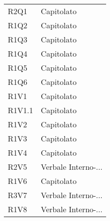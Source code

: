 \begin{center}
\begin{longtable}{C{6cm} C{6cm}}
R2Q1 & Capitolato \\
R1Q2 & Capitolato \\
R1Q3 & Capitolato \\
R1Q4 & Capitolato \\
R1Q5 & Capitolato \\
R1Q6 & Capitolato \\
R1V1 & Capitolato \\
R1V1.1 & Capitolato \\
R1V2 & Capitolato \\
R1V3 & Capitolato \\
R1V4 & Capitolato \\
R2V5 & Verbale Interno-... \\
R1V6 & Capitolato \\
R3V7 & Verbale Interno-... \\
R1V8 & Verbale Interno-... \\

\end{longtable}
\end{center}